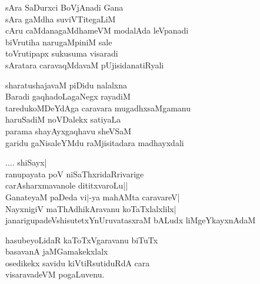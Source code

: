 \begin{entry}

\smallskip
\begin{shl}
sAra SaDurxci BoVjAnadi Gana\\
sAra gaMdha suviVTitegaLiM\\
cAru caMdanagaMdhameVM modalAda leVpanadi\\
biVrutiha narugaMpiniM sale\\
toVrutipapx sukusuma visaradi\\
sAratara caravaqMdavaM pUjisidanatiRyali
\end{shl}
\medskip
{}
\end{entry}

\begin{entry}

\smallskip
\begin{shl}
sharatushajavaM piDidu nalalxna\\
Baradi gaqhadoLagaNegx rayadiM\\
taredukoMDeYdAga caravara mugadhxsaMgamanu\\
haruSadiM noVDalekx satiyaLa\\
parama shayAyxgaqhavu sheVSaM\\
garidu gaNisaleYMdu raMjisitadara madhayxdali
\end{shl}
\medskip
{}
\end{entry}

\begin{entry}

\smallskip
\begin{shl}
.... shiSayx|\\
ranupayata poV niSaThxridaRrivarige\\
carAsharxmavanole dititxvaroLu||\\
GanateyaM paDeda vi|-ya mahAMta caravareV|\\
NayxnigiV maThAdhikAravanu koTaTxlalxlilx|\\
janarigupadeVshisutetxYnUruvatasxraM bALudx liMgeYkayxnAdaM
\end{shl}
\medskip
{}
\end{entry}

\begin{entry}

\smallskip
\begin{shl}
hasubeyoLidaR kaToTxVgaravanu biTuTx\\
basavanA jaMGamakekxlalx\\
osedikekx savidu kiVtiRsutiduRdA cara\\
visaravadeVM pogaLuvenu.
\end{shl}
\medskip
{}
\end{entry}

